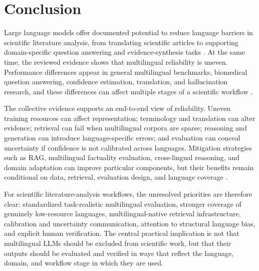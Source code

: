 \documentclass[acmsmall,nonacm]{acmart}
\begin{document}
\section{Conclusion}\label{sec:conclusion}
Large language models offer documented potential to reduce language barriers in scientific literature analysis, from translating scientific articles to supporting domain-specific question answering and evidence-synthesis tasks \cite{Kleidermacher2025,GarcíaFerrero2024,Scherbakov2025}. At the same time, the reviewed evidence shows that multilingual reliability is uneven. Performance differences appear in general multilingual benchmarks, biomedical question answering, confidence estimation, translation, and hallucination research, and these differences can affect multiple stages of a scientific workflow \cite{Hu2020,Xuan2025,GarcíaFerrero2024,Xue2024,Huang2025}.

The collective evidence supports an end-to-end view of reliability. Uneven training resources can affect representation; terminology and translation can alter evidence; retrieval can fail when multilingual corpora are sparse; reasoning and generation can introduce language-specific errors; and evaluation can conceal uncertainty if confidence is not calibrated across languages. Mitigation strategies such as RAG, multilingual factuality evaluation, cross-lingual reasoning, and domain adaptation can improve particular components, but their benefits remain conditional on data, retrieval, evaluation design, and language coverage \cite{Lewis2020,Qin2025,Qiu2024}.

For scientific literature-analysis workflows, the unresolved priorities are therefore clear: standardized task-realistic multilingual evaluation, stronger coverage of genuinely low-resource languages, multilingual-native retrieval infrastructure, calibration and uncertainty communication, attention to structural language bias, and explicit human verification. The central practical implication is not that multilingual LLMs should be excluded from scientific work, but that their outputs should be evaluated and verified in ways that reflect the language, domain, and workflow stage in which they are used.



\end{document}

